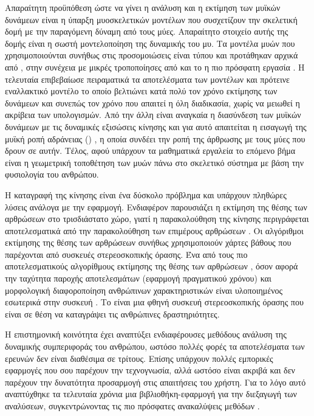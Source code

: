 Απαραίτητη προϋπόθεση ώστε να γίνει η ανάλυση και η εκτίμηση των μυϊκών δυνάμεων είναι η ύπαρξη μυοσκελετικών μοντέλων που συσχετίζουν την σκελετική δομή με την παραγόμενη δύναμη από τους μύες. Απαραίτητο στοιχείο αυτής της δομής είναι η σωστή μοντελοποίηση της δυναμικής του μυ. Τα μοντέλα μυών που χρησιμοποιούνται συνήθως στις προσομοιώσεις είναι τύπου  και προτάθηκαν αρχικά από \cite{zajac89}, στην συνέχεια με μικρές τροποποίησες από \cite{thelen03} και το η πιο πρόσφατη εργασία \cite{millard13}. Η τελευταία επιβεβαίωσε πειραματικά τα αποτελέσματα των μοντέλων και πρότεινε εναλλακτικό μοντέλο το οποίο βελτιώνει κατά πολύ τον χρόνο εκτίμησης των δυνάμεων και συνεπώς τον χρόνο που απαιτεί η όλη διαδικασία, χωρίς να μειωθεί η ακρίβεια των υπολογισμών. Από την άλλη είναι αναγκαία η διασύνδεση των μυϊκών δυνάμεων με τις δυναμικές εξισώσεις κίνησης και για αυτό απαιτείται η εισαγωγή της μυϊκή ροπή αδράνειας () \cite{delp95}, η οποία συνδέει την ροπή της άρθρωσης με τους μύες που δρουν σε αυτήν. Τέλος, αφού υπάρχουν τα μαθηματικά εργαλεία το επόμενο βήμα είναι η γεωμετρική τοποθέτηση των μυών πάνω στο σκελετικό σύστημα με βάση την φυσιολογία του ανθρώπου.

Η καταγραφή της κίνησης είναι ένα δύσκολο πρόβλημα και υπάρχουν πληθώρες λύσεις ανάλογα με την εφαρμογή. Ενδιαφέρον παρουσιάζει η εκτίμηση της θέσης των αρθρώσεων στο τρισδιάστατο χώρο, γιατί η παρακολούθηση της κίνησης περιγράφεται αποτελεσματικά από την παρακολούθηση των επιμέρους αρθρώσεων \cite{poppe07}. Οι αλγόριθμοι εκτίμησης της θέσης των αρθρώσεων συνήθως χρησιμοποιούν χάρτες βάθους που παρέχονται από συσκευές στερεοσκοπικής όρασης. Ένα από τους πιο αποτελεσματικούς αλγορίθμους εκτίμησης της θέσης των αρθρώσεων \cite{shotton11}, όσον αφορά την ταχύτητα παροχής αποτελεσμάτων (εφαρμογή πραγματικού χρόνου) και μορφολογική διαφοροποίηση ανθρώπινων χαρακτηριστικών είναι υλοποιημένος εσωτερικά στην συσκευή . Το  είναι μια φθηνή συσκευή στερεοσκοπικής όρασης που είναι σε θέση να καταγράψει τις ανθρώπινες δραστηριότητες.

Η επιστημονική κοινότητα έχει αναπτύξει ενδιαφέρουσες μεθόδους ανάλυση της δυναμικής συμπεριφοράς του ανθρώπου, ωστόσο πολλές φορές τα αποτελέσματα των ερευνών δεν είναι διαθέσιμα σε τρίτους. Επίσης υπάρχουν πολλές εμπορικές εφαρμογές που σου παρέχουν την τεχνογνωσία, αλλά ωστόσο είναι ακριβά και δεν παρέχουν την δυνατότητα προσαρμογή στις απαιτήσεις του χρήστη. Για το λόγο αυτό αναπτύχθηκε τα τελευταία χρόνια μια βιβλιοθήκη-εφαρμογή για την διεξαγωγή των αναλύσεων, συγκεντρώνοντας τις πιο πρόσφατες ανακαλύψεις μεθόδων \cite{delp07}.

